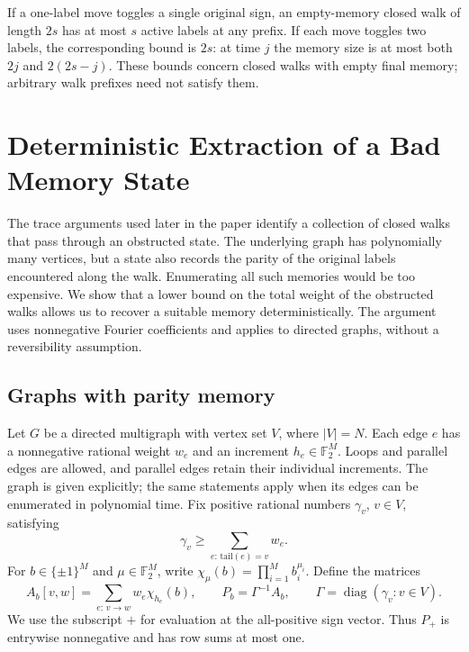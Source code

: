 \documentclass[letterpaper,11pt]{article}
\theoremstyle{definition}
\newcommand{\F}{\mathbb F}
\DeclareMathOperator{\diag}{diag}
\begin{document}
If a one-label move toggles a single original sign, an empty-memory
closed walk of length $2s$ has at most $s$ active labels at any
prefix. If each move toggles two labels, the corresponding bound is
$2s$: at time $j$ the memory size is at most both $2j$ and
$2(2s-j)$. These bounds concern closed walks with empty final memory;
arbitrary walk prefixes need not satisfy them.



\section{Deterministic Extraction of a Bad Memory State}
\label{sec:extraction}

The trace arguments used later in the paper identify a collection of
closed walks that pass through an obstructed state.  The underlying graph
has polynomially many vertices, but a state also records the parity of the
original labels encountered along the walk.  Enumerating all such memories
would be too expensive.  We show that a lower bound on the total weight of
the obstructed walks allows us to recover a suitable memory deterministically.
The argument uses nonnegative Fourier coefficients and applies to directed
graphs, without a reversibility assumption.

\subsection{Graphs with parity memory}

Let $G$ be a directed multigraph with vertex set $V$, where $|V|=N$.
Each edge $e$ has a nonnegative rational weight $w_e$ and an increment
$h_e\in\F_2^M$.  Loops and parallel edges are allowed, and parallel edges
retain their individual increments.  The graph is given explicitly; the
same statements apply when its edges can be enumerated in polynomial time.
Fix positive rational numbers $\gamma_v$, $v\in V$, satisfying
\begin{equation}
  \gamma_v\geq\sum_{e:\,\mathrm{tail}(e)=v}w_e.
  \label{ex:normalization}
\end{equation}
For $b\in\{\pm1\}^M$ and $\mu\in\F_2^M$, write
$\chi_\mu(b)=\prod_{i=1}^M b_i^{\mu_i}$.  Define the matrices
\begin{equation}
  A_b[v,w]=\sum_{e:\,v\to w}w_e\chi_{h_e}(b),
  \qquad
  P_b=\Gamma^{-1}A_b,
  \qquad
  \Gamma=\diag(\gamma_v:v\in V).
  \label{ex:signed-transition}
\end{equation}
We use the subscript $+$ for evaluation at the all-positive sign vector.
Thus $P_+$ is entrywise nonnegative and has row sums at most one.
\end{document}
